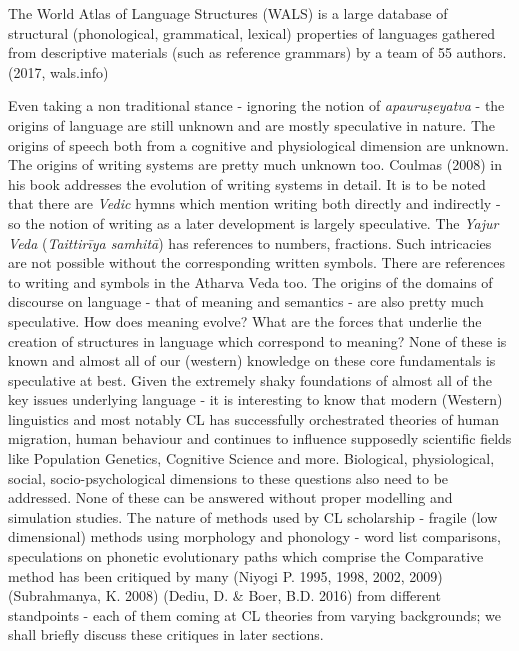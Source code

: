 \begin{myquote}
The World Atlas of Language Structures (WALS) is a large database of structural (phonological, grammatical, lexical) properties of languages gathered from descriptive materials (such as reference grammars) by a team of 55 authors. (2017, wals.info)
\end{myquote}

Even taking a non traditional stance - ignoring the notion of \textit{apauruṣeyatva} - the origins of language are still unknown and are mostly speculative in nature. The origins of speech both from a cognitive and physiological dimension are unknown. The origins of writing systems are pretty much unknown too. Coulmas (2008) in his book addresses the evolution of writing systems in detail. It is to be noted that there are \textit{Vedic} hymns which mention writing both directly and indirectly - so the notion of writing as a later development is largely speculative. The \textit{Yajur Veda} (\textit{Taittirīya samhitā}) has references to numbers, fractions. Such intricacies are not possible without the corresponding written symbols. There are references to writing and symbols in the Atharva Veda too. The origins of the domains of discourse on language - that of meaning and semantics - are also pretty much speculative. How does meaning evolve? What are the forces that underlie the creation of structures in language which correspond to meaning? None of these is known and almost all of our (western) knowledge on these core fundamentals is speculative at best. Given the extremely shaky foundations of almost all of the key issues underlying language - it is interesting to know that modern (Western) linguistics and most notably CL has successfully orchestrated theories of human migration, human behaviour and continues to influence supposedly scientific fields like Population Genetics, Cognitive Science and more. Biological, physiological, social, socio-psychological dimensions to these questions also need to be addressed. None of these can be answered without proper modelling and simulation studies. The nature of methods used by CL scholarship - fragile (low dimensional) methods using morphology and phonology - word list comparisons, speculations on phonetic evolutionary paths which comprise the Comparative method has been critiqued by many (Niyogi P. 1995, 1998, 2002, 2009) (Subrahmanya, K. 2008) (Dediu, D. \& Boer, B.D. 2016) from different standpoints - each of them coming at CL theories from varying backgrounds; we shall briefly discuss these critiques in later sections.


